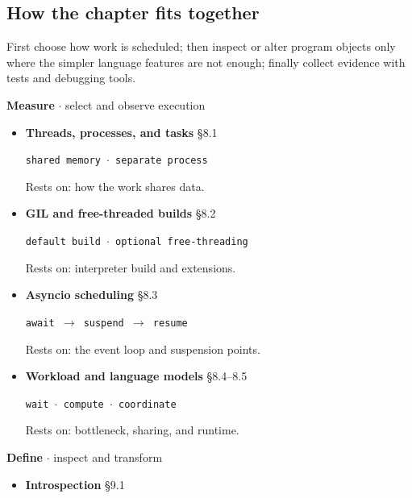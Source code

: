 \documentclass[11pt]{article}
\begin{document}
\begin{keepsection}
\section{How the chapter fits together}

First choose how work is scheduled; then inspect or alter program objects only where the simpler language features are not enough; finally collect evidence with tests and debugging tools.

\textbf{Measure} \ensuremath{\cdot} select and observe execution

\begin{itemize}
\item {}
\textbf{Threads, processes, and tasks} \hfill{\small\color{FAUblue}§8.1}

\texttt{shared memory \ensuremath{\cdot} separate process}

Rests on: how the work shares data.
\item {}
\textbf{GIL and free-threaded builds} \hfill{\small\color{FAUblue}§8.2}

\texttt{default build \ensuremath{\cdot} optional free-threading}

Rests on: interpreter build and extensions.
\item {}
\textbf{Asyncio scheduling} \hfill{\small\color{FAUblue}§8.3}

\texttt{await \ensuremath{\to} suspend \ensuremath{\to} resume}

Rests on: the event loop and suspension points.
\item {}
\textbf{Workload and language models} \hfill{\small\color{FAUblue}§8.4–8.5}

\texttt{wait \ensuremath{\cdot} compute \ensuremath{\cdot} coordinate}

Rests on: bottleneck, sharing, and runtime.
\end{itemize}

\textbf{Define} \ensuremath{\cdot} inspect and transform

\begin{itemize}
\item {}
\textbf{Introspection} \hfill{\small\color{FAUblue}§9.1}


\end{itemize}
\end{keepsection}
\end{document}
